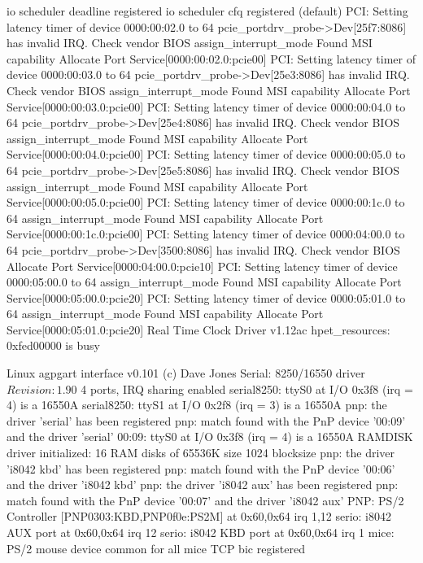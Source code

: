 \documentclass[mingoth,a4paper]{jsarticle}
\begin{document}
{{{{{{{{{{{{{{{{{\begin{commandline}
io scheduler deadline registered
io scheduler cfq registered (default)
PCI: Setting latency timer of device 0000:00:02.0 to 64
pcie_portdrv_probe->Dev[25f7:8086] has invalid IRQ. Check vendor BIOS
assign_interrupt_mode Found MSI capability
Allocate Port Service[0000:00:02.0:pcie00]
PCI: Setting latency timer of device 0000:00:03.0 to 64
pcie_portdrv_probe->Dev[25e3:8086] has invalid IRQ. Check vendor BIOS
assign_interrupt_mode Found MSI capability
Allocate Port Service[0000:00:03.0:pcie00]
PCI: Setting latency timer of device 0000:00:04.0 to 64
pcie_portdrv_probe->Dev[25e4:8086] has invalid IRQ. Check vendor BIOS
assign_interrupt_mode Found MSI capability
Allocate Port Service[0000:00:04.0:pcie00]
PCI: Setting latency timer of device 0000:00:05.0 to 64
pcie_portdrv_probe->Dev[25e5:8086] has invalid IRQ. Check vendor BIOS
assign_interrupt_mode Found MSI capability
Allocate Port Service[0000:00:05.0:pcie00]
PCI: Setting latency timer of device 0000:00:1c.0 to 64
assign_interrupt_mode Found MSI capability
Allocate Port Service[0000:00:1c.0:pcie00]
PCI: Setting latency timer of device 0000:04:00.0 to 64
pcie_portdrv_probe->Dev[3500:8086] has invalid IRQ. Check vendor BIOS
Allocate Port Service[0000:04:00.0:pcie10]
PCI: Setting latency timer of device 0000:05:00.0 to 64
assign_interrupt_mode Found MSI capability
Allocate Port Service[0000:05:00.0:pcie20]
PCI: Setting latency timer of device 0000:05:01.0 to 64
assign_interrupt_mode Found MSI capability
Allocate Port Service[0000:05:01.0:pcie20]
Real Time Clock Driver v1.12ac
hpet_resources: 0xfed00000 is busy
\end{commandline}
\begin{commandline}
Linux agpgart interface v0.101 (c) Dave Jones
Serial: 8250/16550 driver $Revision: 1.90 $ 4 ports, IRQ sharing enabled
serial8250: ttyS0 at I/O 0x3f8 (irq = 4) is a 16550A
serial8250: ttyS1 at I/O 0x2f8 (irq = 3) is a 16550A
pnp: the driver 'serial' has been registered
pnp: match found with the PnP device '00:09' and the driver 'serial'
00:09: ttyS0 at I/O 0x3f8 (irq = 4) is a 16550A
RAMDISK driver initialized: 16 RAM disks of 65536K size 1024 blocksize
pnp: the driver 'i8042 kbd' has been registered
pnp: match found with the PnP device '00:06' and the driver 'i8042 kbd'
pnp: the driver 'i8042 aux' has been registered
pnp: match found with the PnP device '00:07' and the driver 'i8042 aux'
PNP: PS/2 Controller [PNP0303:KBD,PNP0f0e:PS2M] at 0x60,0x64 irq 1,12
serio: i8042 AUX port at 0x60,0x64 irq 12
serio: i8042 KBD port at 0x60,0x64 irq 1
mice: PS/2 mouse device common for all mice
TCP bic registered

\end{commandline}}}}}}}}}}}}}}}}}}
\end{document}

